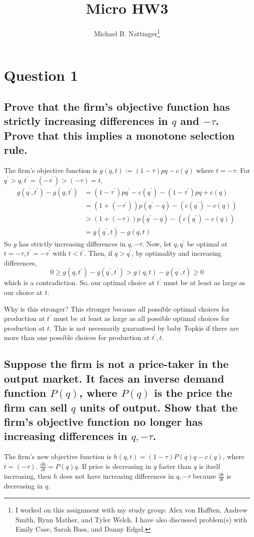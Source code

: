 \documentclass[11pt]{article} %
\title{Micro HW3}
\author{Michael B. Nattinger\footnote{I worked on this assignment with my study group: Alex von Hafften, Andrew Smith, Ryan Mather, and Tyler Welch. I have also discussed problem(s) with Emily Case, Sarah Bass, and Danny Edgel.}}
\begin{document}
\maketitle

\section{Question 1}
\subsection{Prove that the firm's objective function has strictly increasing differences in $q$ and $-\tau$. Prove that this implies a monotone selection rule.}
The firm's objective function is $g(q,t):= (1-\tau)pq - c(q)$ where $t = -\tau$. For $q^{'}>q,t^{'} = (-\tau^{'})>(-\tau) = t$,
\begin{align*}
g(q^{'},t^{'}) - g(q,t^{'}) &=  (1-\tau^{'})pq^{'} - c(q^{'}) - (1-\tau^{'})pq + c(q)\\
&=   (1+(-\tau^{'}))p(q^{'} - q) - (c(q^{'}) -c(q))\\
&> (1+(-\tau))p(q^{'} - q) - (c(q^{'}) -c(q))\\
&= g(q^{'},t) - g(q,t)
\end{align*}
So $g$ has strictly increasing differences in $q,-\tau$. Now, let $q,q^{'}$ be optimal at $t = -\tau,t^{'} = -\tau^{'}$ with $t<t^{'}$. Then, if $q>q^{'}$, by optimality and increasing differences,
\begin{equation*}
0 \geq g(q,t^{'}) - g(q^{'},t^{'})> g(q,t) - g(q^{'},t) \geq 0
\end{equation*}
which is a contradiction. So, our optimal choice at $t^{'}$ must be at least as large as our choice at $t$.

Why is this stronger? This stronger because all possible optimal choices for production at $t^{'}$ must be at least as large as all possible optimal choices for production at $t$.  This is not necessarily guaranteed by baby Topkis if there are more than one possible choices for production at $t^{'},t$.
\subsection{Suppose the firm is not a price-taker in the output market. It faces an inverse demand function $P(q)$, where $P(q)$ is the price the firm can sell $q$ units of output. Show that the firm's objective function no longer has increasing differences in $q,-\tau$.}
The firm's new objective function is $h(q,t) = (1-\tau)P(q)q - c(q)$, where $t=(-\tau)$. $\frac{\partial h}{\partial t} = P(q)q$. If price is decreasing in $q$ faster than $q$ is itself increasing,  then $h$ does not have increasing differences in $q,-\tau$ because $\frac{\partial h}{\partial t}$ is decreasing in $q$.
\end{document}

